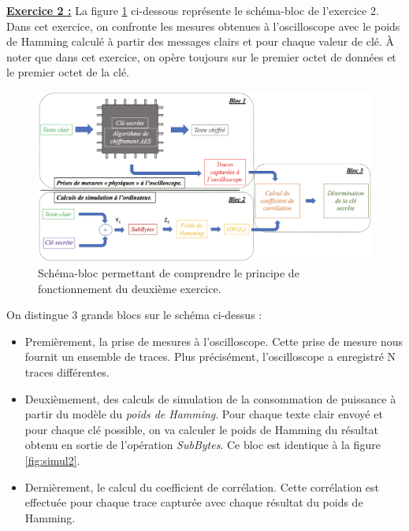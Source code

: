 \documentclass[10pt, oneside, a4paper]{article}
\begin{document}
\hspace{-0.5 cm}\textbf{\underline{Exercice 2 :}} La figure \ref{fig:simulEx2} ci-dessous représente le schéma-bloc de l'exercice 2. Dans cet exercice, on confronte les mesures obtenues à l'oscilloscope avec le poids de Hamming calculé à partir des messages clairs et pour chaque valeur de clé. À noter que dans cet exercice, on opère toujours sur le premier octet de données et le premier octet de la clé.
\begin{figure}[htbp]
    \centering
    \includegraphics[scale=0.4]{image/simulEx2}
    \caption{Schéma-bloc permettant de comprendre le principe de fonctionnement du deuxième exercice.}
    \label{fig:simulEx2} 
\end{figure}

\vspace{-0.3 cm}On distingue 3 grands blocs sur le schéma ci-dessus :
\begin{itemize}
\item Premièrement, la prise de mesures à l'oscilloscope. Cette prise de mesure nous fournit un ensemble de traces. Plus précisément, l'oscilloscope a enregistré N traces différentes.
\item Deuxièmement, des calculs de simulation de la consommation de puissance à partir du modèle du \textit{poids de Hamming}. Pour chaque texte clair envoyé et pour chaque clé possible, on va calculer le poids de Hamming du résultat obtenu en sortie de l'opération \textit{SubBytes}. Ce bloc est identique à la figure \ref{fig:simul2}.
\item Dernièrement, le calcul du coefficient de corrélation. Cette corrélation est effectuée pour chaque trace capturée avec chaque résultat du poids de Hamming. 
\end{itemize}
\end{document}

